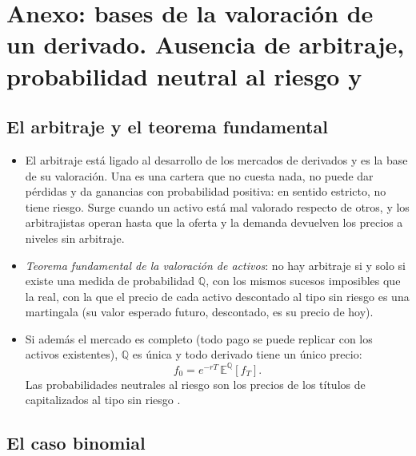 \documentclass[11pt]{article}
\begin{document}
\clearpage
\appendix

\section{Anexo: bases de la valoración de un derivado.\cortetitulo{} Ausencia de arbitraje, probabilidad neutral al riesgo y }\label{anexo:valoracion-neutral}

\subsection{El arbitraje y el teorema fundamental}

\begin{itemize}
\item El arbitraje está ligado al desarrollo de los mercados de derivados y es la base de su valoración. Una  es una cartera que no cuesta nada, no puede dar pérdidas y da ganancias con probabilidad positiva: en sentido estricto, no tiene riesgo. Surge cuando un activo está mal valorado respecto de otros, y los arbitrajistas operan hasta que la oferta y la demanda devuelven los precios a niveles sin arbitraje.
\item \emph{Teorema fundamental de la valoración de activos}\nocite{HarrisonKreps1979,HarrisonPliska1981Martingales}: no hay arbitraje si y solo si existe una medida de probabilidad $\mathbb{Q}$, con los mismos sucesos imposibles que la real, con la que el precio de cada activo descontado al tipo sin riesgo es una martingala (su valor esperado futuro, descontado, es su precio de hoy).
\item Si además el mercado es completo (todo pago se puede replicar con los activos existentes), $\mathbb{Q}$ es única y todo derivado tiene un único precio\nocite{Duffie2001Dynamic}:
  \begin{equation}\label{eq:teorema-fundamental}
  f_0=e^{-rT}\,\mathbb{E}^{\mathbb{Q}}[f_T].
  \end{equation}
  Las probabilidades neutrales al riesgo son los precios de los títulos de  capitalizados al tipo sin riesgo .
\end{itemize}

\subsection{El caso binomial}
\end{document}
